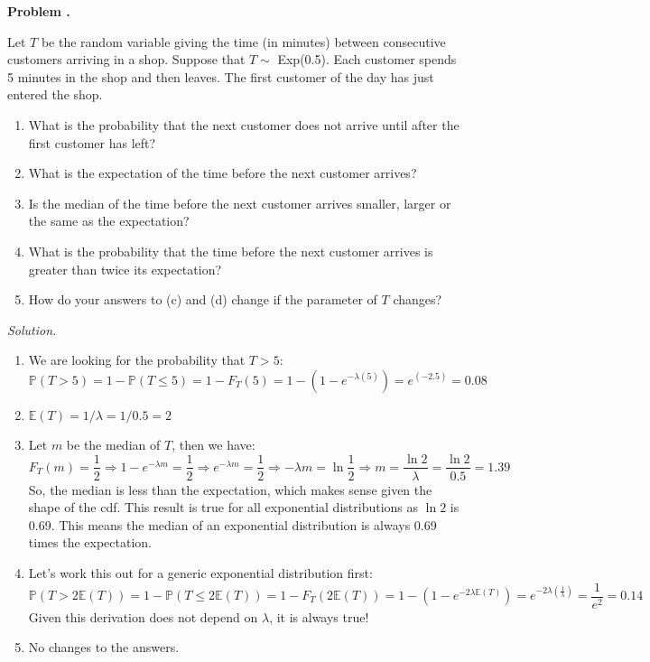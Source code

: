 \documentclass[11pt]{article}
\newcounter{problem}
\newenvironment{problem}[1][]{%
  \refstepcounter{problem}%
  \bigskip\noindent\textbf{Problem \theproblem. #1}\par\smallskip\noindent
}{\bigskip}
\newenvironment{solution}{%
  \noindent\textit{Solution.}\quad
}{\par\bigskip}
\begin{document}
\begin{problem}
Let $T$ be the random variable giving the time (in minutes) between consecutive 
customers arriving in a shop. Suppose that $T \sim $ Exp(0.5). Each customer spends
5 minutes in the shop and then leaves. The first customer of the day has just 
entered the shop. 
\begin{enumerate}
      \item What is the probability that the next customer does not arrive until 
            after the first customer has left?
      \item What is the expectation of the time before the next customer arrives?
      \item Is the median of the time before the next customer arrives smaller, 
            larger or the same as the expectation?
      \item What is the probability that the time before the next customer arrives
            is greater than twice its expectation?
      \item How do your answers to (c) and (d) change if the parameter of $T$ changes?
\end{enumerate}
\end{problem}

\begin{solution}
\begin{enumerate}
      \item We are looking for the probability that $T > 5$:
            \[
            \mathbb{P}(T > 5) = 1 - \mathbb{P}(T \le 5)
            = 1 - F_T(5) = 1 - (1 - e^{-\lambda(5)}) = e^{(-2.5)} = 0.08
            \]
      \item $\mathbb{E}(T) = 1 / \lambda = 1 / 0.5 = 2$
      \item Let $m$ be the median of $T$, then we have:
            \[
            F_T(m) = \frac{1}{2}
            \Rightarrow 1 - e^{-\lambda m} = \frac{1}{2}
            \Rightarrow e^{-\lambda m} = \frac{1}{2}
            \Rightarrow -\lambda m = \ln{\frac{1}{2}}
            \Rightarrow m = \frac{\ln{2}}{\lambda} = \frac{\ln{2}}{0.5} = 1.39
            \]
            So, the median is less than the expectation, which makes sense given 
            the shape of the cdf. This result is true for all exponential distributions
            as $\ln{2}$ is 0.69. This means the median of an exponential distribution 
            is always 0.69 times the expectation.
      \item Let's work this out for a generic exponential distribution first:
            \[
            \mathbb{P}(T > 2 \mathbb{E}(T)) = 
            1 - \mathbb{P}(T \le 2 \mathbb{E}(T)) = 
            1 - F_T(2 \mathbb{E}(T)) = 
            1 - (1 - e^{-2\lambda \mathbb{E}(T)}) = 
            e^{-2\lambda (\frac{1}{\lambda})} = \frac{1}{e^2} = 0.14
            \]
            Given this derivation does not depend on $\lambda$, it is always true!
      \item No changes to the answers.
\end{enumerate}
\end{solution}
\end{document}
